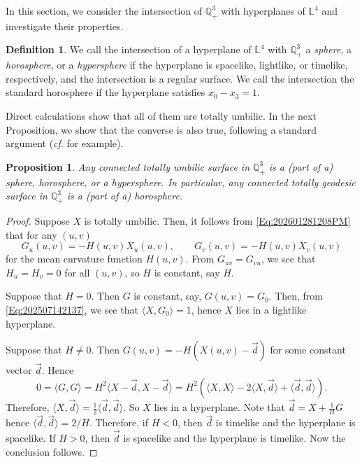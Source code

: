 \documentclass[12pt,reqno]{amsart}
\theoremstyle{plain} %
\newtheorem{proposition}[theorem]{Proposition}
\theoremstyle{definition}
\newtheorem{definition}[theorem]{Definition}
\numberwithin{equation}{section}
\newcommand{\qthreep}{\mathbb{Q}^3_+}
\newcommand{\lfour}{\mathbb{L}^4}
\newcommand{\h}{H}%
\begin{document}
In this  section, we consider the intersection of $\qthreep$ with hyperplanes of $\lfour$ and investigate their properties.

\begin{definition}\label{Def:202601140823PM}
	We call the intersection of a hyperplane of $\lfour$ with $\qthreep$ a \textit{sphere}, a \textit{horosphere}, or a \textit{hypersphere}
	if the hyperplane is spacelike, lightlike, or timelike, respectively, and the intersection is a regular surface.
	We call the intersection the standard horosphere if the hyperplane satisfies $x_0-x_3=1$.
\end{definition}

Direct calculations show that all of them are totally umbilic. In the next Proposition, we show that the converse is also true, following a standard argument (\textit{cf}. \cite[Ch~7, Theorem~29]{Spivak} for example).
\begin{proposition}\label{Prop:202601150810PM}
	Any connected totally umbilic surface in $\qthreep$ is a (part of a) sphere, horosphere, or a hypersphere.
	In particular, any connected totally geodesic surface in $\qthreep$ is a (part of a) horosphere.
\end{proposition}\label{Prop:202601150642AM}

\begin{proof}
	Suppose $X$ is totally umbilic. Then, it follows from \eqref{Eq:202601281208PM} that for any $(u,v)$
	$$
		G_u(u,v) = -H(u,v) X_u(u,v), \qquad
		G_v(u,v) = -H(u,v) X_v(u,v)
	$$
	for the mean curvature function $H(u,v) $.
	From $G_{uv} = G_{vu}$, we see that $H_u=H_v=0$ for all $(u,v)$, so $H$ is constant, say $\h$.

	Suppose that $\h = 0$. Then $G$ is constant, say, $G(u,v)=G_0$. Then, from \eqref{Eq:202507142137}, we see that $\langle X, G_0 \rangle = 1$,
	hence $X$ lies in a lightlike hyperplane.

	Suppose that $\h \not= 0$. Then
	$
		G(u,v) = -\h ( X(u,v) - \vec{d} )
	$
	for some constant vector $\vec{d}$.
	Hence
	$$
		0 = \langle G, G \rangle = \h^2 \langle X-\vec{d}, X-\vec{d} \rangle = \h^2 ( \langle X, X \rangle - 2 \langle X, \vec{d} \rangle + \langle \vec{d},\vec{d} \rangle).
	$$
	Therefore,
	$
		\langle X, \vec{d} \rangle = \tfrac{1}{2} \langle \vec{d}, \vec{d} \rangle.
	$
	So $X$ lies in a hyperplane.
	Note that $\vec{d} = X + \tfrac{1}{\h} G$ hence
	$
		\langle \vec{d}, \vec{d} \rangle = 2/\h.
	$
	Therefore, if $\h<0$, then $\vec{d}$ is timelike and the hyperplane is spacelike.
	If $\h>0$, then $\vec{d}$ is spacelike and the hyperplane is timelike. Now the conclusion follows.
\end{proof}
\end{document}
